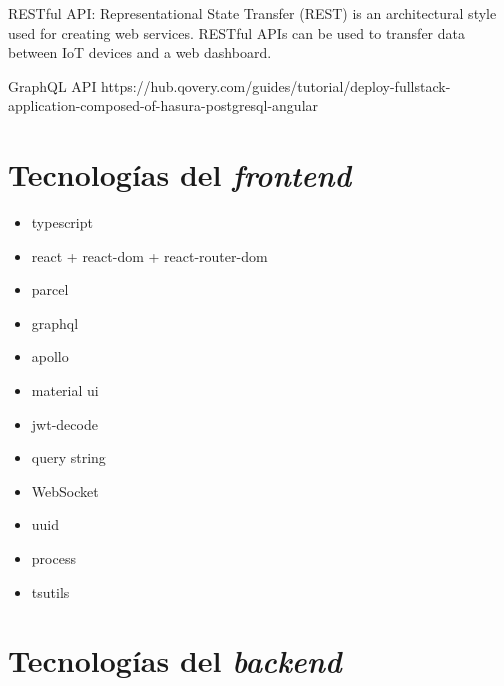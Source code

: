 RESTful API: Representational State Transfer (REST) is an architectural style used for creating web services. RESTful APIs can be used to transfer data between IoT devices and a web dashboard.

GraphQL API https://hub.qovery.com/guides/tutorial/deploy-fullstack-application-composed-of-hasura-postgresql-angular



\section{Tecnologías del \textit{frontend}}

\begin{itemize}

  \item typescript 
  
  \item react + react-dom + react-router-dom

  \item parcel 

  \item graphql
  
  \item apollo

  \item material ui


  \item jwt-decode

  \item query string

  \item WebSocket

  \item uuid
  
  \item process 

  \item tsutils

\end{itemize}



\section{Tecnologías del \textit{backend}}

